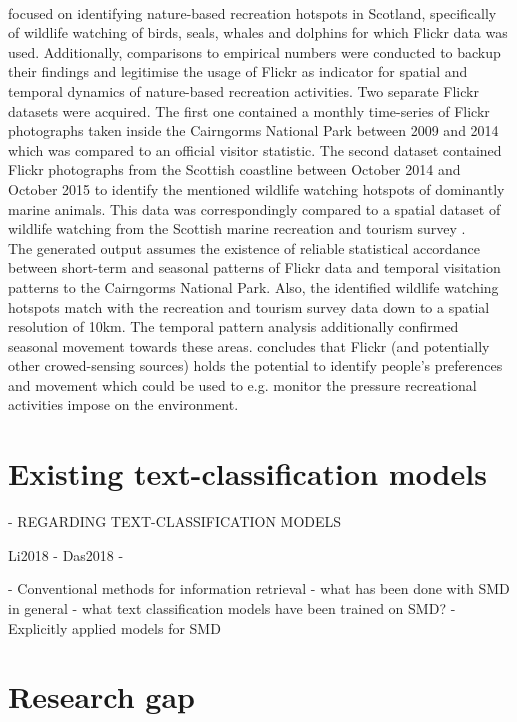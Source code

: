 \paragraph*{\textcite{Mancini2018}} focused on identifying nature-based recreation hotspots in Scotland, specifically of wildlife watching of birds, seals, whales and dolphins for which Flickr data was used. Additionally, comparisons to empirical numbers were conducted to backup their findings and legitimise the usage of Flickr as indicator for spatial and temporal dynamics of nature-based recreation activities.
Two separate Flickr datasets were acquired. The first one contained a monthly time-series of Flickr photographs taken inside the Cairngorms National Park between 2009 and 2014 which was compared to an official visitor statistic. The second dataset contained Flickr photographs from the Scottish coastline between October 2014 and October 2015 to identify the mentioned wildlife watching hotspots of dominantly marine animals. This data was correspondingly compared to a spatial dataset of wildlife watching from the Scottish marine recreation and tourism survey \parencite{LUC2016}. \\
The generated output assumes the existence of reliable statistical accordance between short-term and seasonal patterns of Flickr data and temporal visitation patterns to the Cairngorms National Park.  
Also, the identified wildlife watching hotspots match with the recreation and tourism survey data down to a spatial resolution of 10km. The temporal pattern analysis additionally confirmed seasonal movement towards these areas. \textcite{Mancini2018} concludes that Flickr (and potentially other crowed-sensing sources) holds the potential to identify people's preferences and movement which could be used to e.g. monitor the pressure recreational activities impose on the environment.

\section{Existing text-classification models}
    - REGARDING TEXT-CLASSIFICATION MODELS
    
Li2018 - 
Das2018 - 





    - Conventional methods for information retrieval 
    - what has been done with SMD in general
    - what text classification models have been trained on SMD?
    - Explicitly applied models for SMD    







\section{Research gap}
